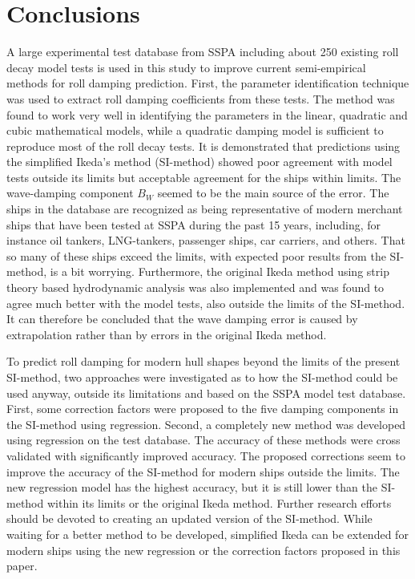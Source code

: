 \section{Conclusions}
\label{se:conclusions}
A large experimental test database from SSPA including about 250 existing roll decay model tests is used in this study to improve current semi-empirical methods for roll damping prediction. First, the parameter identification technique was used to extract roll damping coefficients from these tests. The method was found to work very well in identifying the parameters in the linear, quadratic and cubic mathematical models, while a quadratic damping model is sufficient to reproduce most of the roll decay tests. It is demonstrated that predictions using the simplified Ikeda's method (SI-method) showed poor agreement with model tests outside its limits but acceptable agreement for the ships within limits. The wave-damping component $B_W$ seemed to be the main source of the error. The ships in the database are recognized as being representative of modern merchant ships that have been tested at SSPA during the past 15 years, including, for instance oil tankers, LNG-tankers, passenger ships, car carriers, and others. That so many of these ships exceed the limits, with expected poor results from the SI-method, is a bit worrying. Furthermore, the original Ikeda method using strip theory based hydrodynamic analysis was also implemented and was found to agree much better with the model tests, also outside the limits of the SI-method. It can therefore be concluded that the wave damping error is caused by extrapolation rather than by  errors in the original Ikeda method.

To predict roll damping for modern hull shapes beyond the limits of the present SI-method, two approaches were investigated as to how the SI-method could be used anyway, outside its limitations and based on the SSPA model test database. First, some correction factors were proposed to the five damping components in the SI-method using regression. Second, a completely new method was developed using regression on the test database. The accuracy of these methods were cross validated with significantly improved accuracy. The proposed corrections seem to improve the accuracy of the SI-method for modern ships outside the limits. The new regression model has the highest accuracy, but it is still lower than the SI-method within its limits or the original Ikeda method. Further research efforts should be devoted to creating an updated version of the SI-method. While waiting for a better method to be developed, simplified Ikeda can be extended for modern ships using the new regression or the correction factors proposed in this paper. 




